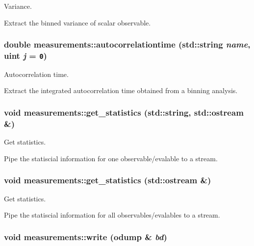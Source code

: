 Variance. 

Extract the binned variance of scalar observable. \hypertarget{classmeasurements_a9a1fcf0fa8d064af612ac370aae422f}{
\subsubsection[autocorrelationtime]{\setlength{\rightskip}{0pt plus 5cm}double measurements::autocorrelationtime (std::string {\em name}, \/  uint {\em j} = {\tt 0})}}
\label{classmeasurements_a9a1fcf0fa8d064af612ac370aae422f}


Autocorrelation time. 

Extract the integrated autocorrelation time obtained from a binning analysis. \hypertarget{classmeasurements_0d0e8ac163265e3a02ca83e150221ed4}{
\subsubsection[get\_\-statistics]{\setlength{\rightskip}{0pt plus 5cm}void measurements::get\_\-statistics (std::string, \/  std::ostream \&)}}
\label{classmeasurements_0d0e8ac163265e3a02ca83e150221ed4}


Get statistics. 

Pipe the statiscial information for one observable/evalable to a stream. \hypertarget{classmeasurements_e6a871ac853fd836b49b56cb0ef5c70c}{
\subsubsection[get\_\-statistics]{\setlength{\rightskip}{0pt plus 5cm}void measurements::get\_\-statistics (std::ostream \&)}}
\label{classmeasurements_e6a871ac853fd836b49b56cb0ef5c70c}


Get statistics. 

Pipe the statiscial information for all observables/evalables to a stream. \hypertarget{classmeasurements_26690b08604d461717312270d40021d4}{
\subsubsection[write]{\setlength{\rightskip}{0pt plus 5cm}void measurements::write (odump \& {\em bd})}}
\label{classmeasurements_26690b08604d461717312270d40021d4}


